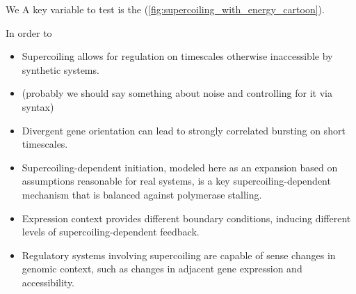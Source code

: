 \documentclass[11pt]{article}
\begin{document}
We 
A key variable to test is the 
(\cref{fig:supercoiling_with_energy_cartoon}).

In order to 

\begin{itemize}
    \item Supercoiling allows for regulation on timescales otherwise inaccessible by synthetic systems.

    \item (probably we should say something about noise and controlling for it via syntax)

    \item Divergent gene orientation can lead to strongly correlated bursting on short timescales.

    \item Supercoiling-dependent initiation, modeled here as an expansion based on assumptions reasonable for real systems, is a key supercoiling-dependent mechanism that is balanced against polymerase stalling.

    \item Expression context provides different boundary conditions, inducing different levels of supercoiling-dependent feedback.

    \item Regulatory systems involving supercoiling are capable of sense changes in genomic context, such as changes in adjacent gene expression and accessibility.
\end{itemize}
\end{document}
